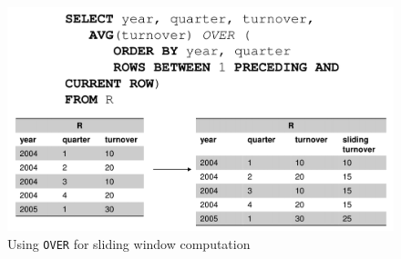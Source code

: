 \documentclass{article}
\begin{document}
\begin{figure}[hp]
    \centering
    \includegraphics[width=\textwidth]{window.png}
    \caption{Using \lstinline{OVER} for sliding window computation}
    \label{fig:window}
\end{figure}
\end{document}
